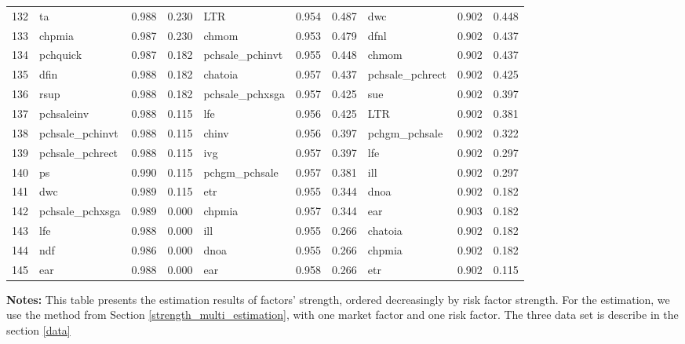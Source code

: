 \begin{landscape}
\begin{footnotesize}
\begin{longtable}{l|lcc|lcc|lcc}
  132 & ta & 0.988 & 0.230 & LTR & 0.954 & 0.487 & dwc & 0.902 & 0.448 \\ 
  133 & chpmia & 0.987 & 0.230 & chmom & 0.953 & 0.479 & dfnl & 0.902 & 0.437 \\ 
  134 & pchquick & 0.987 & 0.182 & pchsale\_pchinvt & 0.955 & 0.448 & chmom & 0.902 & 0.437 \\ 
  135 & dfin & 0.988 & 0.182 & chatoia & 0.957 & 0.437 & pchsale\_pchrect & 0.902 & 0.425 \\ 
  136 & rsup & 0.988 & 0.182 & pchsale\_pchxsga & 0.957 & 0.425 & sue & 0.902 & 0.397 \\ 
  137 & pchsaleinv & 0.988 & 0.115 & lfe & 0.956 & 0.425 & LTR & 0.902 & 0.381 \\ 
  138 & pchsale\_pchinvt & 0.988 & 0.115 & chinv & 0.956 & 0.397 & pchgm\_pchsale & 0.902 & 0.322 \\ 
  139 & pchsale\_pchrect & 0.988 & 0.115 & ivg & 0.957 & 0.397 & lfe & 0.902 & 0.297 \\ 
  140 & ps & 0.990 & 0.115 & pchgm\_pchsale & 0.957 & 0.381 & ill & 0.902 & 0.297 \\ 
  141 & dwc & 0.989 & 0.115 & etr & 0.955 & 0.344 & dnoa & 0.902 & 0.182 \\ 
  142 & pchsale\_pchxsga & 0.989 & 0.000 & chpmia & 0.957 & 0.344 & ear & 0.903 & 0.182 \\ 
  143 & lfe & 0.988 & 0.000 & ill & 0.955 & 0.266 & chatoia & 0.902 & 0.182 \\ 
  144 & ndf & 0.986 & 0.000 & dnoa & 0.955 & 0.266 & chpmia & 0.902 & 0.182 \\ 
  145 & ear & 0.988 & 0.000 & ear & 0.958 & 0.266 & etr & 0.902 & 0.115 \\ 
   \hline

\end{longtable}

			\begin{minipage}{1.4\textwidth}
	{\footnotesize {\bf Notes:} 
		This table presents the estimation results of factors' strength, ordered decreasingly by risk factor strength.
For the estimation, we use the method from Section \ref{strength_multi_estimation},  with one market factor and one risk factor.
The three data set is describe in the section \ref{data}}
\end{minipage}
\end{footnotesize}
\end{landscape}



